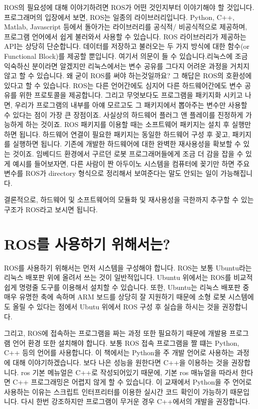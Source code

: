 \documentclass[11pt,fleqn]{book} %
\begin{document}
ROS의 필요성에 대해 이야기하려면 ROS가 어떤 것인지부터 이야기해야 할 것입니다.
프로그래머의 입장에서 보면, ROS는 일종의 라이브러리입니다. Python, C++, Matlab, Javascript 등에서 돌아가는 라이브러리를 공식적/ 비공식적으로 제공하며,
프로그램 언어에서 쉽게 불러와서 사용할 수 있습니다. ROS 라이브러리가 제공하는 API는 상당히 단순합니다.
데이터를 저장하고 불러오는 두 가지 방식에 대한 함수(or Functional Block)를 제공할 뿐입니다.
여기서 의문이 들 수 있습니다.리눅스에 조금 익숙하신 분이라면 알겠지만 리눅스에서는 변수 공유를 그다지 어려운 과정을 거치지 않고 할 수 있습니다.
왜 굳이 ROS를 써야 하는것일까요? 그 해답은 ROS의 호환성에 있다고 할 수 있습니다. ROS는 다른 언어간에도 심지어 다른 하드웨어간에도 변수 공유를 위한 프로토콜을 제공합니다.
그리고 무엇보다도 프로그램을 패키지화 시키고 나면, 우리가 프로그램의 내부를 아얘 모르고도 그 패키지에서 뽑아주는 변수만 사용할 수 있다는 점이 가장 큰 장점이죠.
사실상의 하드웨어 플러그 앤 플레이를 진정하게 가능하게 하는 것이죠.
ROS 패키지를 이용할 때는 소프트웨어 패키지는 설치 후 실행만 하면 됩니다. 하드웨어 연결이 필요한 패키지는 동일한 하드웨어 구성 후 꽂고, 패키지를 실행하면 됩니다.
기존에 개발한 하드웨어에 대한 완벽한 재사용성을 확보할 수 있는 것이죠.
임베디드 환경에서 구르던 로봇 프로그래머들에게 조금 더 감을 잡을 수 있게 예시를 들어보자면,
다른 사람이 짠 아두이노 시스템을 컴퓨터에 꽂기만 하면 주요 변수를 ROS가 directory 형식으로 정리해서 보여준다는 말도 안되는 일이 가능해집니다.

결론적으로, 하드웨어 및 소프트웨어의 모듈화 및 재사용성을 극한까지 추구할 수 있는 구조가 ROS라고 보시면 됩니다.



\section{ROS를 사용하기 위해서는?}

ROS를 사용하기 위해서는 먼저 시스템을 구성해야 합니다. ROS는 보통 Ubuntu라는 리눅스 배포판 위에
올려서 쓰는 것이 일반적입니다. Ubuntu 위에서는 ROS를 비교적 쉽게 명령줄 도구를 이용해서 설치할 수 있습니다.
또한, Ubuntu는 리눅스 배포판 중 매우 유명한 축에 속하며 ARM 보드를 상당히 잘 지원하기 때문에 소형 로봇 시스템에도 올릴 수 있다는 점에서 Ubutu 위에서 ROS 구성 후 실습을 하시는 것을 권장합니다.

그리고, ROS에 접속하는 프로그램을 짜는 과정 또한 필요하기 때문에 개발용 프로그램 언어 환경 또한 설치해야 합니다.
보통 ROS 접속 프로그램을 짤 떄는 Python, C++ 등의 언어를 사용합니다. 이 책에서는 Python을 주 개발 언어로 사용하는 과정에 대해 이야기하겠습니다.
보다 나은 성능을 원한다면 C++을 이용하는 것을 권장합니다. ros 기본 메뉴얼은 C++로 작성되어있기 때문에, 기본 ros 매뉴얼을 따라서 한다면 C++ 프로그래밍은 어렵지 않게 할 수 있습니다.
이 교재에서 Python을 주 언어로 사용하는 이유는 스크립트 인터프리터를 이용한 실시간 코드 확인이 가능하기 때문입니다. 다시 한번 강조하지만 프로그램이 무거운 경우 C++에서의 개발을 권장합니다.
\end{document}
